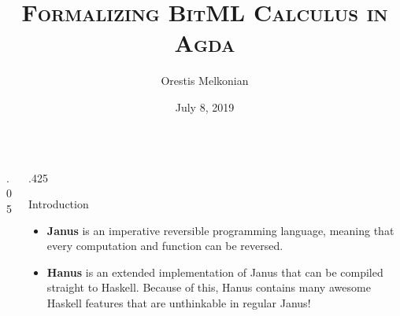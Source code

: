\documentclass[final,hyperref={pdfpagelabels=false}]{beamer}
\title{\LARGE \textsc{Formalizing BitML Calculus in Agda}}
\author{Orestis Melkonian}
\date{July 8, 2019}
\institute{Utrecht University, The Netherlands}
\newcommand\sepsize{.05\textwidth}
\newcommand\colsize{.425\textwidth}
\begin{document}

\begin{frame}[t] %

\begin{columns}[t] %

\begin{column}{\sepsize}\end{column} %

\begin{column}{\colsize} %


\begin{block}{Introduction}
  \begin{itemize}
    \item \textbf{Janus} is an imperative reversible programming language, meaning that every computation and function can be reversed.
    \vspace{1cm}
    \item \textbf{Hanus} is an extended implementation of Janus that can be compiled straight to Haskell. Because of this, Hanus contains many awesome Haskell features that are unthinkable in regular Janus!
  \end{itemize}
\end{block}


\end{column}
\end{columns}
\end{frame}
\end{document}
